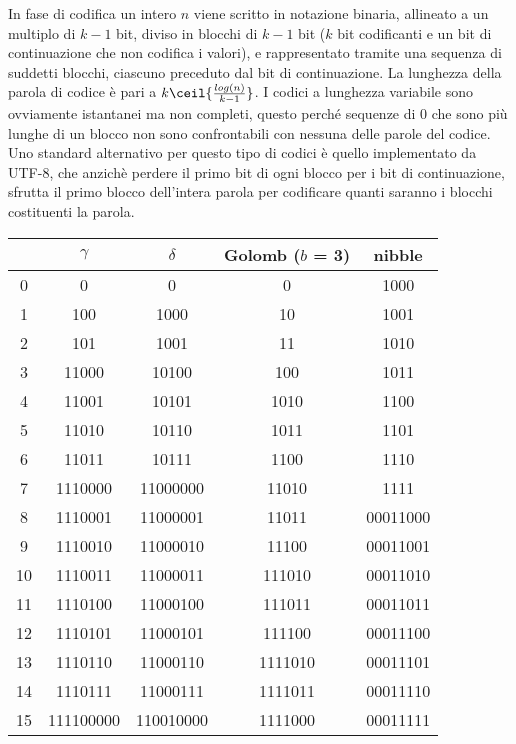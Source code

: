 In fase di codifica un intero $n$ viene scritto in notazione binaria, allineato a un multiplo di $k - 1$ bit, diviso in blocchi di $k - 1$ bit ($k$ bit codificanti e un bit di continuazione che non codifica i valori), e rappresentato tramite una sequenza di suddetti blocchi, ciascuno preceduto dal bit di continuazione. La lunghezza della parola di codice è pari a $k \ceil{ \frac {log(n)} {k-1}}$. I codici a lunghezza variabile sono ovviamente istantanei ma non completi, questo perché sequenze di 0 che sono più lunghe di un blocco non sono confrontabili con nessuna delle parole del codice. Uno standard alternativo per questo tipo di codici è quello implementato da UTF-8, che anzichè perdere il primo bit di ogni blocco per i bit di continuazione, sfrutta il primo blocco dell'intera parola per codificare quanti saranno i blocchi costituenti la parola.
\begin{table}[ht]
	\centering
	\begin{tabular}{|c||c|c|c|c|}
		\hline
		   & $\gamma$  & $\delta$  & Golomb ($b$ = 3) & nibble   \\
		\hline
		0  & 0         & 0         & 0                & 1000     \\
		1  & 100       & 1000      & 10               & 1001     \\
		2  & 101       & 1001      & 11               & 1010     \\
		3  & 11000     & 10100     & 100              & 1011     \\
		4  & 11001     & 10101     & 1010             & 1100     \\
		5  & 11010     & 10110     & 1011             & 1101     \\
		6  & 11011     & 10111     & 1100             & 1110     \\
		7  & 1110000   & 11000000  & 11010            & 1111     \\
		8  & 1110001   & 11000001  & 11011            & 00011000 \\
		9  & 1110010   & 11000010  & 11100            & 00011001 \\
		10 & 1110011   & 11000011  & 111010           & 00011010 \\
		11 & 1110100   & 11000100  & 111011           & 00011011 \\
		12 & 1110101   & 11000101  & 111100           & 00011100 \\
		13 & 1110110   & 11000110  & 1111010          & 00011101 \\
		14 & 1110111   & 11000111  & 1111011          & 00011110 \\
		15 & 111100000 & 110010000 & 1111000          & 00011111 \\
		\hline
	\end{tabular}
\end{table}
